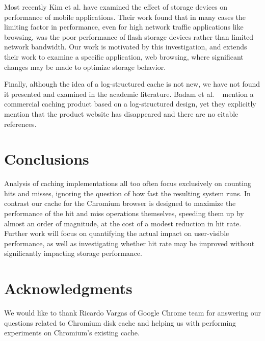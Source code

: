 \documentclass[letterpaper,twocolumn,10pt]{article}
\begin{document}
Most recently Kim et al. \cite{kim12} have examined the effect of storage
devices on performance of mobile applications. Their work found that in many
cases the limiting factor in performance, even for high network traffic
applications like browsing, was the poor performance of flash storage devices
rather than limited network bandwidth. Our work is motivated by this
investigation, and extends their work to examine a specific application, web
browsing, where significant changes may be made to optimize storage behavior.

Finally, although the idea of a log-structured cache is not new, we have not
found it presented and examined in the academic literature.  Badam et
al. ~\cite{hashcache} mention a commercial caching product based on a
log-structured design, yet they explicitly mention that the product website has
disappeared and there are no citable references.

\section{Conclusions}

Analysis of caching implementations all too often focus exclusively on
counting hits and misses, ignoring the question of how fast the
resulting system runs. In contrast our cache for the Chromium browser
is designed to maximize the performance of the hit and miss operations
themselves, speeding them up by almost an order of magnitude, at the
cost of a modest reduction in hit rate. Further work will focus on
quantifying the actual impact on user-visible performance, as well as
investigating whether hit rate may be improved without significantly
impacting storage performance.

\section*{Acknowledgments}

We would like to thank Ricardo Vargas of Google Chrome team for answering our
questions related to Chromium disk cache and helping us with performing
experiments on Chromium's existing cache.


\end{document}

